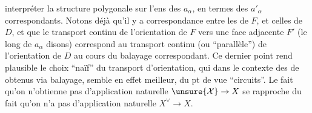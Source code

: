 interpréter la structure polygonale sur
l'ens des $a_\alpha$, en termes des $a'_\alpha$
correspondants. Notons déjà qu'il y
a correspondance entre les  
de $F$, et celles de $D$, et que le
transport continu de l'orientation de
$F$ vers une face adjacente $F'$
(le long de $a_\alpha$ disons) correspond au
transport continu (ou ``parallèle'') de
l'orientation de $D$ au cours du balayage
correspondant.  Ce dernier point
rend plausible le choix ``naïf'' du
transport d'orientation, qui dans le contexte
des  de  obtenus via balayage,
semble en effet meilleur, du pt de
vue ``circuits''. Le fait qu'on n'obtienne
pas d'application naturelle $\unsure{\mathcal X}\to X$ se
rapproche du fait qu'on n'a pas d'application
naturelle $X^\vee\to X$.


